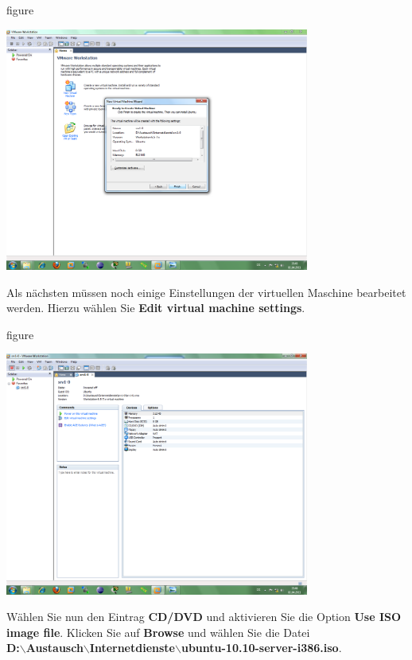 \begin{nofloat}{figure}
\begin{center}
\includegraphics[width=0.75\textwidth]{screenshots/vm07.png}
\end{center}
\end{nofloat}

Als nächsten müssen noch einige Einstellungen der virtuellen Maschine bearbeitet werden. Hierzu wählen Sie
\textbf{Edit virtual machine settings}.

\begin{nofloat}{figure}
\begin{center}
\includegraphics[width=0.75\textwidth]{screenshots/vm08.png}
\end{center}
\end{nofloat}

Wählen Sie nun den Eintrag \textbf{CD/DVD} und aktivieren Sie die Option \textbf{Use ISO image file}. Klicken Sie auf \textbf{Browse}
und wählen Sie die Datei \\ \textbf{D:$\backslash$Austausch$\backslash$Internetdienste$\backslash$ubuntu-10.10-server-i386.iso}.

